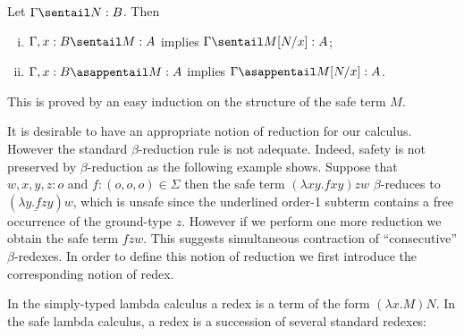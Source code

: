 \begin{lemma}
\label{lem:subst_preserves_safety}
Let $\Gamma \sentail N : B$. Then
\begin{enumerate}[(i)]
  \item $\Gamma, x :B \sentail M : A$ implies $\Gamma \sentail M[N/x] : A$;
  \item $\Gamma, x :B \asappentail M : A$ implies $\Gamma \asappentail M[N/x] : A$.
\end{enumerate}
\end{lemma}
This is proved by an easy induction on the structure of the safe term $M$.
\smallskip

It is desirable to have an appropriate notion of reduction for our
calculus. However the standard $\beta$-reduction rule is not
adequate. Indeed, safety is not preserved by $\beta$-reduction as
the following example shows. Suppose that $w,x,y,z : o$ and $f :
(o,o,o) \in \Sigma$ then the safe term $(\lambda x y . f x y) z w$
$\beta$-reduces to $(\underline{\lambda y . f z y}) w$, which is
unsafe since the underlined order-1 subterm contains a free
occurrence of the ground-type $z$. However if we perform one more
reduction we obtain the safe term $f z w$. This suggests
simultaneous contraction of ``consecutive'' $\beta$-redexes. In
order to define this notion of reduction we first introduce the
corresponding notion of redex.

In the simply-typed lambda calculus a redex is a term of the form
$(\lambda x . M) N$. In the safe lambda calculus, a redex is a
succession of several standard redexes:

